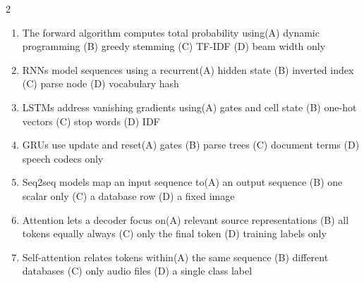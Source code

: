 \documentclass[a4paper]{article}
\begin{document}
\begin{multicols*}{2}
\begin{enumerate}[resume]
\item The forward algorithm computes total probability using\newline\hspace*{0.6em}(A) dynamic programming \quad (B) greedy stemming \newline\hspace*{0.6em}(C) TF-IDF \quad (D) beam width only
\item RNNs model sequences using a recurrent\newline\hspace*{0.6em}(A) hidden state \quad (B) inverted index \newline\hspace*{0.6em}(C) parse node \quad (D) vocabulary hash
\item LSTMs address vanishing gradients using\newline\hspace*{0.6em}(A) gates and cell state \quad (B) one-hot vectors \newline\hspace*{0.6em}(C) stop words \quad (D) IDF
\item GRUs use update and reset\newline\hspace*{0.6em}(A) gates \quad (B) parse trees \newline\hspace*{0.6em}(C) document terms \quad (D) speech codecs only
\item Seq2seq models map an input sequence to\newline\hspace*{0.6em}(A) an output sequence \quad (B) one scalar only \newline\hspace*{0.6em}(C) a database row \quad (D) a fixed image
\item Attention lets a decoder focus on\newline\hspace*{0.6em}(A) relevant source representations \quad (B) all tokens equally always \newline\hspace*{0.6em}(C) only the final token \quad (D) training labels only
\item Self-attention relates tokens within\newline\hspace*{0.6em}(A) the same sequence \quad (B) different databases \newline\hspace*{0.6em}(C) only audio files \quad (D) a single class label

\end{enumerate}
\end{multicols*}
\end{document}
